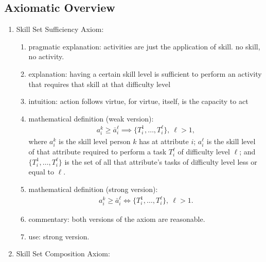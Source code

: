 \documentclass{elsarticle} %
\begin{document}
\subsection{Axiomatic Overview}
\begin{enumerate}
    \item Skill Set Sufficiency Axiom:
          \begin{enumerate}
            \item pragmatic explanation: activities are just the application of skill. no skill, no activity.
            \item explanation: having a certain skill level is sufficient to perform an activity that requires that skill at that difficulty level
              \item intuition: action follows virtue, for virtue, itself, is the capacity to act
              \item mathematical definition (weak version):
                    \begin{gather*}
                        a_{i}^{k} \geq
                        \bar{a}_{i}^{\ell}
                        \implies \{
                        T_{i}^{1}, \dots, T_{i}^{\ell}
                        \}
                        ,\ {\ell} > 1
                        ,
                    \end{gather*}
                    where $a_{i}^{k}$ is the skill level person $k$ has at attribute $i$;
                    $a_{i}^{\ell}$ is the skill level of that attribute required to perform a task $T_{i}^{\ell}$ of difficulty level $\ell$;
                    and $\{T_{i}^{1}, \dots, T_{i}^{\ell}\}$ is the set of all that attribute's tasks of difficulty level less or equal to $\ell$.
              \item mathematical definition (strong version):
                    \begin{gather*}
                        a_{i}^{k} \geq
                        \bar{a}_{i}^{\ell}
                        \iff \{
                        T_{i}^{1}, \dots, T_{i}^{\ell}
                        \}
                        ,\ {\ell} > 1
                        .
                    \end{gather*}
              \item commentary: both versions of the axiom are reasonable.
              \item use: strong version.
          \end{enumerate}
          \item Skill Set Composition Axiom:

\end{enumerate}
\end{document}
